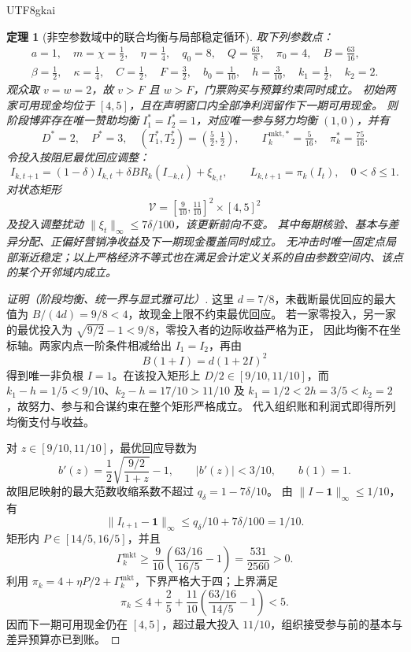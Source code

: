 \documentclass[12pt,a4paper,openany]{report}
\newtheorem{theorem}{定理}[chapter]
\begin{document}
\begin{CJK*}{UTF8}{gkai}
\begin{theorem}[非空参数域中的联合均衡与局部稳定循环]
\label{thm:constructive-equilibrium-cycle}
取下列参数点：
\[
 \begin{gathered}
 a=1,\quad m=\chi=\tfrac12,\quad \eta=\tfrac14,\quad
 q_0=8,\quad Q=\tfrac{63}{8},\quad \pi_0=4,\quad B=\tfrac{63}{16},\\
 \beta=\tfrac12,\quad \kappa=\tfrac14,\quad C=\tfrac12,\quad F=\tfrac32,\quad
 b_0=\tfrac1{10},\quad h=\tfrac3{10},\quad
 k_1=\tfrac12,\quad k_2=2.
 \end{gathered}
\]
观众取 \(v=w=2\)，故 \(v>F\) 且 \(w>F\)，门票购买与预算约束同时成立。
初始两家可用现金均位于 \([4,5]\)，且在声明窗口内全部净利润留作下一期可用现金。
则阶段博弈存在唯一赞助均衡 \(I_1^*=I_2^*=1\)，对应唯一参与努力均衡 \((1,0)\)，并有
\[
 D^*=2,\quad P^*=3,\quad (T_1^*,T_2^*)=(\tfrac52,\tfrac12),\qquad
 \Gamma_k^{\mathrm{mkt},*}=\tfrac5{16},\quad \pi_k^*=\tfrac{75}{16}.
\]
令投入按阻尼最优回应调整：
\[
 I_{k,t+1}=(1-\delta)I_{k,t}+\delta BR_k(I_{-k,t})+\xi_{k,t},
 \qquad L_{k,t+1}=\pi_k(I_t),\quad 0<\delta\le1.
\]
对状态矩形
\[
 \mathcal V=[\tfrac9{10},\tfrac{11}{10}]^2\times[4,5]^2
\]
及投入调整扰动 \(\|\xi_t\|_\infty\le7\delta/100\)，该更新前向不变。
其中每期核验、基本与差异分配、正偏好营销净收益及下一期现金覆盖同时成立。
无冲击时唯一固定点局部渐近稳定；以上严格经济不等式也在满足会计定义关系的自由参数空间内、该点的某个开邻域内成立。
\end{theorem}

\begin{proof}[证明（阶段均衡、统一界与显式雅可比）]
这里 \(d=7/8\)，未截断最优回应的最大值为 \(B/(4d)=9/8<4\)，故现金上限不约束最优回应。
若一家零投入，另一家的最优投入为 \(\sqrt{9/2}-1<9/8\)，零投入者的边际收益严格为正，
因此均衡不在坐标轴。两家内点一阶条件相减给出 \(I_1=I_2\)，再由
\[
 B(1+I)=d(1+2I)^2
\]
得到唯一非负根 \(I=1\)。在该投入矩形上 \(D/2\in[9/10,11/10]\)，而
\(k_1-h=1/5<9/10\)、\(k_2-h=17/10>11/10\) 及
\(k_1=1/2<2h=3/5<k_2=2\)，故努力、参与和合谋约束在整个矩形严格成立。
代入组织账和利润式即得所列均衡支付与收益。

对 \(z\in[9/10,11/10]\)，最优回应导数为
\[
 b'(z)=\frac12\sqrt{\frac{9/2}{1+z}}-1,\qquad |b'(z)|<3/10,\qquad b(1)=1.
\]
故阻尼映射的最大范数收缩系数不超过 \(q_\delta=1-7\delta/10\)。
由 \(\|I-\mathbf1\|_\infty\le1/10\)，有
\[
 \|I_{t+1}-\mathbf1\|_\infty
 \le q_\delta/10+7\delta/100=1/10.
\]
矩形内 \(P\in[14/5,16/5]\)，并且
\[
 \Gamma_k^{\mathrm{mkt}}
 \ge\frac9{10}\left(\frac{63/16}{16/5}-1\right)
 =\frac{531}{2560}>0.
\]
利用 \(\pi_k=4+\eta P/2+\Gamma_k^{\mathrm{mkt}}\)，下界严格大于四；上界满足
\[
 \pi_k\le4+\frac25
       +\frac{11}{10}\left(\frac{63/16}{14/5}-1\right)<5.
\]
因而下一期可用现金仍在 \([4,5]\)，超过最大投入 \(11/10\)，组织接受参与前的基本与差异预算亦已到账。


\end{proof}
\end{CJK*}
\end{document}
